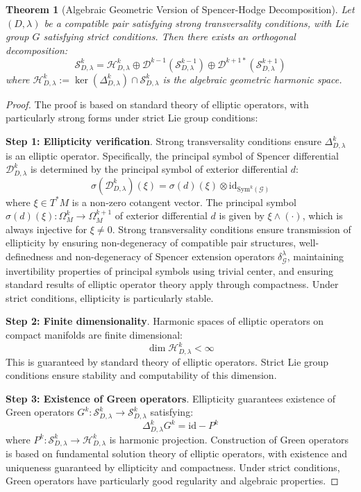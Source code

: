 \documentclass[a4paper,12pt]{extarticle}
\newtheorem{theorem}{Theorem}
\theoremstyle{definition}
\begin{document}
\begin{theorem}[Algebraic Geometric Version of Spencer-Hodge Decomposition]
Let $(D,\lambda)$ be a compatible pair satisfying strong transversality conditions, with Lie group $G$ satisfying strict conditions. Then there exists an orthogonal decomposition:
\begin{equation}\label{eq:alg-hodge-detailed}
\mathcal{S}^k_{D,\lambda} = \mathcal{H}^k_{D,\lambda} \oplus \mathcal{D}^{k-1}(\mathcal{S}^{k-1}_{D,\lambda}) \oplus \mathcal{D}^{k+1*}(\mathcal{S}^{k+1}_{D,\lambda})
\end{equation}
where $\mathcal{H}^k_{D,\lambda} := \ker(\Delta^k_{D,\lambda}) \cap \mathcal{S}^k_{D,\lambda}$ is the algebraic geometric harmonic space.
\end{theorem}

\begin{proof}
The proof is based on standard theory of elliptic operators, with particularly strong forms under strict Lie group conditions:

\textbf{Step 1: Ellipticity verification}. Strong transversality conditions ensure $\Delta^k_{D,\lambda}$ is an elliptic operator. Specifically, the principal symbol of Spencer differential $\mathcal{D}^k_{D,\lambda}$ is determined by the principal symbol of exterior differential $d$:
$$\sigma(\mathcal{D}^k_{D,\lambda})(\xi) = \sigma(d)(\xi) \otimes \text{id}_{\mathrm{Sym}^k(\mathcal{G})}$$
where $\xi \in T^*M$ is a non-zero cotangent vector. The principal symbol $\sigma(d)(\xi): \Omega^k_M \to \Omega^{k+1}_M$ of exterior differential $d$ is given by $\xi \wedge (\cdot)$, which is always injective for $\xi \neq 0$. Strong transversality conditions ensure transmission of ellipticity by ensuring non-degeneracy of compatible pair structures, well-definedness and non-degeneracy of Spencer extension operators $\delta^{\lambda}_{\mathcal{G}}$, maintaining invertibility properties of principal symbols using trivial center, and ensuring standard results of elliptic operator theory apply through compactness. Under strict conditions, ellipticity is particularly stable.

\textbf{Step 2: Finite dimensionality}. Harmonic spaces of elliptic operators on compact manifolds are finite dimensional:
$$\dim \mathcal{H}^k_{D,\lambda} < \infty$$
This is guaranteed by standard theory of elliptic operators. Strict Lie group conditions ensure stability and computability of this dimension.

\textbf{Step 3: Existence of Green operators}. Ellipticity guarantees existence of Green operators $G^k: \mathcal{S}^k_{D,\lambda} \to \mathcal{S}^k_{D,\lambda}$ satisfying:
$$\Delta^k_{D,\lambda} G^k = \text{id} - P^k$$
where $P^k: \mathcal{S}^k_{D,\lambda} \to \mathcal{H}^k_{D,\lambda}$ is harmonic projection. Construction of Green operators is based on fundamental solution theory of elliptic operators, with existence and uniqueness guaranteed by ellipticity and compactness. Under strict conditions, Green operators have particularly good regularity and algebraic properties.


\end{proof}
\end{document}
